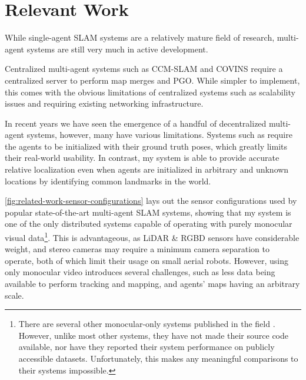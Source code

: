 \section{Relevant Work}
\label{sec:relevant-work}
While single-agent SLAM systems are a relatively mature field of research, multi-agent systems are still very much in active development.

Centralized multi-agent systems such as CCM-SLAM \autocite{schmuck2019ccm} and COVINS \autocite{schmuck2021covins} require a centralized server to perform map merges and PGO. While simpler to implement, this comes with the obvious limitations of centralized systems such as scalability issues and requiring existing networking infrastructure.

In recent years we have seen the emergence of a handful of decentralized multi-agent systems, however, many have various limitations. Systems such as \autocite{doi:10.1126/scirobotics.abm5954} \autocite{8658783} \autocite{DBLP:journals/corr/abs-2103-12770} require the agents to be initialized with their ground truth poses, which greatly limits their real-world usability. In contrast, my system is able to provide accurate relative localization even when agents are initialized in arbitrary and unknown locations by identifying common landmarks in the world.

\autoref{fig:related-work-sensor-configurations} lays out the sensor configurations used by popular state-of-the-art multi-agent SLAM systems, showing that my system is one of the only distributed systems capable of operating with purely monocular visual data\footnote[1]{There are several other monocular-only systems published in the field \autocite{egodagamage2017collaborative} \autocite{chen2018distributed} \autocite{bresson2012real}. However, unlike most other systems, they have not made their source code available, nor have they reported their system performance on publicly accessible datasets. Unfortunately, this makes any meaningful comparisons to their systems impossible.}. This is advantageous, as LiDAR \& RGBD sensors have considerable weight, and stereo cameras may require a minimum camera separation to operate, both of which limit their usage on small aerial robots. However, using only monocular video introduces several challenges, such as less data being available to perform tracking and mapping, and agents' maps having an arbitrary scale.


